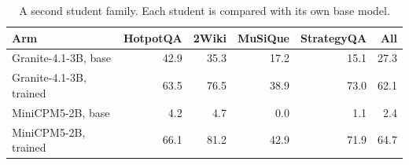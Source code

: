 \begin{table}[t]
\centering
\small
\caption{A second student family. Each student is compared with its own base model.}
\label{tab:E05-students}
\begin{tabular}{lrrrrr}
\toprule
Arm & HotpotQA & 2Wiki & MuSiQue & StrategyQA & All \\
\midrule
Granite-4.1-3B, base & 42.9 & 35.3 & 17.2 & 15.1 & 27.3 \\
Granite-4.1-3B, trained & 63.5 & 76.5 & 38.9 & 73.0 & 62.1 \\
MiniCPM5-2B, base & 4.2 & 4.7 & 0.0 & 1.1 & 2.4 \\
MiniCPM5-2B, trained & 66.1 & 81.2 & 42.9 & 71.9 & 64.7 \\
\bottomrule
\end{tabular}
\end{table}
